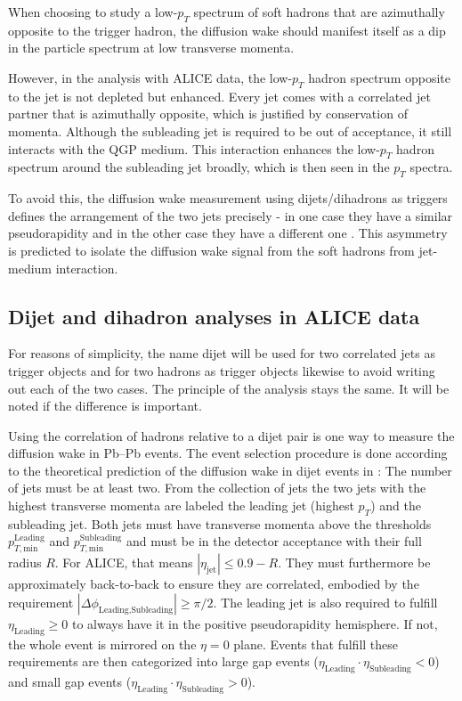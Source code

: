 \documentclass[
  a4paper,
  12pt,
  oneside,
  parskip=half,
  listof=totoc,
  bibliography=totoc,
  DIV=12,
  numbers=noenddot,
  BA.tex
  ]{subfiles}
\begin{document}
When choosing to study a low-$p_T$ spectrum of soft hadrons that are azimuthally opposite to the trigger hadron, the diffusion wake should manifest itself as a dip in the particle spectrum at low transverse momenta. 

However, in the analysis with ALICE data, the low-$p_T$ hadron spectrum opposite to the jet is not depleted but enhanced. Every jet comes with a correlated jet partner that is azimuthally opposite, which is justified by conservation of momenta. Although the subleading jet is required to be out of acceptance, it still interacts with the QGP medium. This interaction enhances the low-$p_T$ hadron spectrum around the subleading jet broadly, which is then seen in the $p_T$ spectra.

To avoid this, the diffusion wake measurement using dijets/dihadrons as triggers defines the arrangement of the two jets precisely - in one case they have a similar pseudorapidity and in the other case they have a different one \cite{yang_rapidity_2025}. This asymmetry is predicted to isolate the diffusion wake signal from the soft hadrons from jet-medium interaction.

\subsection{Dijet and dihadron analyses in ALICE data}
\label{sec:dianaALICE}

For reasons of simplicity, the name dijet will be used for two correlated jets as trigger objects and for two hadrons as trigger objects likewise to avoid writing out each of the two cases. The principle of the analysis stays the same. It will be noted if the difference is important.

Using the correlation of hadrons relative to a dijet pair is one way to measure the diffusion wake in Pb--Pb events. The event selection procedure is done according to the theoretical prediction of the diffusion wake in dijet events in \cite{yang_background-free_2025}: The number of jets must be at least two. From the collection of jets the two jets with the highest transverse momenta are labeled the leading jet (highest $p_T$) and the subleading jet. Both jets must have transverse momenta above the thresholds $p_{T,\text{min}}^\text{Leading}$ and $p_{T,\text{min}}^\text{Subleading}$ and must be in the detector acceptance with their full radius $R$. For ALICE, that means $|\eta_\text{jet}| \leq 0.9 - R$. They must furthermore be approximately back-to-back to ensure they are correlated, embodied by the requirement $|\Delta \phi_{\text{Leading}, \text{Subleading}}| \geq \pi/2$. The leading jet is also required to fulfill $\eta_{\text{Leading}} \geq 0$ to always have it in the positive pseudorapidity hemisphere. If not, the whole event is mirrored on the $\eta=0$ plane. Events that fulfill these requirements are then categorized into large gap events ($\eta_{\text{Leading}} \cdot \eta_{\text{Subleading}} < 0$) and small gap events ($\eta_{\text{Leading}} \cdot \eta_{\text{Subleading}} > 0$).
\end{document}
